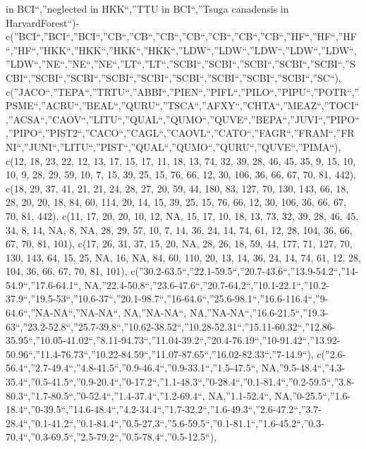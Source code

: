 \documentclass[
]{article}
\begin{document}
in BCI``,''neglected in HKK``,''TTU in BCI``,''Tsuga canadensis in
HarvardForest``)-c(''BCI``,''BCI``,''BCI``,''CB``,''CB``,''CB``,''CB``,''CB``,''CB``,''CB``,''HF``,''HF``,''HF``,''HF``,''HKK``,''HKK``,''HKK``,''HKK``,''LDW``,''LDW``,''LDW``,''LDW``,''LDW``,''LDW``,''NE``,''NE``,''NE``,''LT``,''LT``,''SCBI``,''SCBI``,''SCBI``,''SCBI``,''SCBI``,''SCBI``,''SCBI``,''SCBI``,''SCBI``,''SCBI``,''SCBI``,''SCBI``,''SCBI``,''SCBI``,''SC``),
c(''JACO``,''TEPA``,''TRTU``,''ABBI``,''PIEN``,''PIFL``,''PILO``,''PIPU``,''POTR``,''PSME``,''ACRU``,''BEAL``,''QURU``,''TSCA``,''AFXY``,''CHTA``,''MEAZ``,''TOCI``,''ACSA``,''CAOV``,''LITU``,''QUAL``,''QUMO``,''QUVE``,''BEPA``,''JUVI``,''PIPO``,''PIPO``,''PIST2``,''CACO``,''CAGL``,''CAOVL``,''CATO``,''FAGR``,''FRAM``,''FRNI``,''JUNI``,''LITU``,''PIST``,''QUAL``,''QUMO``,''QURU``,''QUVE``,''PIMA``),
c(12, 18, 23, 22, 12, 13, 17, 15, 17, 11, 18, 13, 74, 32, 39, 28, 46,
45, 35, 9, 15, 10, 10, 9, 28, 29, 59, 10, 7, 15, 39, 25, 15, 76, 66, 12,
30, 106, 36, 66, 67, 70, 81, 442), c(18, 29, 37, 41, 21, 21, 24, 28, 27,
20, 59, 44, 180, 83, 127, 70, 130, 143, 66, 18, 28, 20, 20, 18, 84, 60,
114, 20, 14, 15, 39, 25, 15, 76, 66, 12, 30, 106, 36, 66, 67, 70, 81,
442), c(11, 17, 20, 20, 10, 12, NA, 15, 17, 10, 18, 13, 73, 32, 39, 28,
46, 45, 34, 8, 14, NA, 8, NA, 28, 29, 57, 10, 7, 14, 36, 24, 14, 74, 61,
12, 28, 104, 36, 66, 67, 70, 81, 101), c(17, 26, 31, 37, 15, 20, NA, 28,
26, 18, 59, 44, 177, 71, 127, 70, 130, 143, 64, 15, 25, NA, 16, NA, 84,
60, 110, 20, 13, 14, 36, 24, 14, 74, 61, 12, 28, 104, 36, 66, 67, 70,
81, 101),
c(''30.2-63.5``,''22.1-59.5``,''20.7-43.6``,''13.9-54.2``,''14-54.9``,''17.6-64.1``,
NA,''22.4-50.8``,''23.6-47.6``,''20.7-64.2``,''10.1-22.1``,''10.2-37.9``,''19.5-53``,''10.6-37``,''20.1-98.7``,''16-64.6``,''25.6-98.1``,''16.6-116.4``,''9-64.6``,''NA-NA``,''NA-NA``,
NA,''NA-NA``,
NA,''NA-NA``,''16.6-21.5``,''19.3-63``,''23.2-52.8``,''25.7-39.8``,''10.62-38.52``,''10.28-52.31``,''15.11-60.32``,''12.86-35.95``,''10.05-41.02``,''8.11-94.73``,''11.04-39.2``,''20.4-76.19``,''10-91.42``,''13.92-50.96``,''11.4-76.73``,''10.22-84.59``,''11.07-87.65``,''16.02-82.33``,''7-14.9``),
c(''2.6-56.4``,''2.7-49.4``,''4.8-41.5``,''0.9-46.4``,''0.9-33.1``,''1.5-47.5``,
NA,''9.5-48.4``,''4.3-35.4``,''0.5-41.5``,''0.9-20.4``,''0-17.2``,''1.1-48.3``,''0-28.4``,''0.1-81.4``,''0.2-59.5``,''3.8-80.3``,''1.7-80.5``,''0-52.4``,''1.4-37.4``,''1.2-69.4``,
NA,''1.1-52.4``,
NA,''0-25.5``,''1.6-18.4``,''0-39.5``,''14.6-48.4``,''4.2-34.4``,''1.7-32.2``,''1.6-49.3``,''2.6-47.2``,''3.7-28.4``,''0.1-41.2``,''0.1-84.4``,''0.5-27.3``,''5.6-59.5``,''0.1-81.1``,''1.6-45.2``,''0.3-70.4``,''0.3-69.5``,''2.5-79.2``,''0.5-78.4``,''0.5-12.5``),
\end{document}
